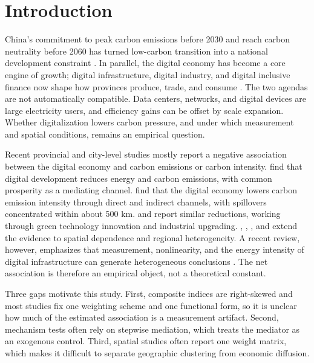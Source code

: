 \documentclass[economies,article,submit,moreauthors]{Definitions/mdpi}
\begin{document}
\section{Introduction}

China's commitment to peak carbon emissions before 2030 and reach carbon neutrality before 2060 has turned low-carbon transition into a national development constraint \citep{state2021}. In parallel, the digital economy has become a core engine of growth; digital infrastructure, digital industry, and digital inclusive finance now shape how provinces produce, trade, and consume \citep{tapscott,g20}. The two agendas are not automatically compatible. Data centers, networks, and digital devices are large electricity users, and efficiency gains can be offset by scale expansion. Whether digitalization lowers carbon pressure, and under which measurement and spatial conditions, remains an empirical question.

Recent provincial and city-level studies mostly report a negative association between the digital economy and carbon emissions or carbon intensity. \citet{gao2024} find that digital development reduces energy and carbon emissions, with common prosperity as a mediating channel. \citet{zhang2025} find that the digital economy lowers carbon emission intensity through direct and indirect channels, with spillovers concentrated within about 500 km. \citet{huangwu2024} and \citet{zhang2024sust} report similar reductions, working through green technology innovation and industrial upgrading. \citet{song2024}, \citet{yuan2024}, \citet{wang2025}, and \citet{niu2024} extend the evidence to spatial dependence and regional heterogeneity. A recent review, however, emphasizes that measurement, nonlinearity, and the energy intensity of digital infrastructure can generate heterogeneous conclusions \citep{liuwang2025}. The net association is therefore an empirical object, not a theoretical constant.

Three gaps motivate this study. First, composite indices are right-skewed and most studies fix one weighting scheme and one functional form, so it is unclear how much of the estimated association is a measurement artifact. Second, mechanism tests often rely on stepwise mediation, which treats the mediator as an exogenous control. Third, spatial studies often report one weight matrix, which makes it difficult to separate geographic clustering from economic diffusion.
\end{document}
